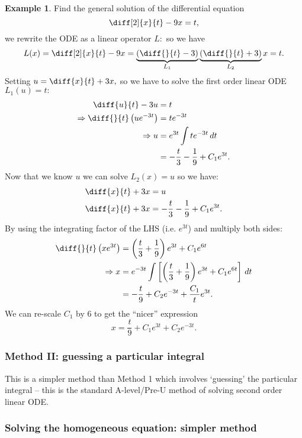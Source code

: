 \documentclass[12pt, a4paper]{article}
\newcommand{\f}[2]{\frac{#1}{#2}}
\newcommand{\imply}{\Rightarrow}
\theoremstyle{definition}
\newtheorem*{example}{Example}
\theoremstyle{plain}
\begin{document}
\begin{example}
Find the general solution of the differential equation $$\diff[2]{x}{t}-9x=t,$$ we rewrite the ODE as a linear operator $L:$ so we have $$L(x)=\diff[2]{x}{t}-9x =\underbrace{\left(\diff{}{t}-3\right)}_{L_1}\underbrace{\left(\diff{}{t}+3\right)}_{L_2}x=t.$$ Setting $u = \diff{x}{t}+3x,$ so we have to solve the first order linear ODE $L_1(u)=t:$ $$\begin{aligned}
\diff{u}{t}-3u&=t\\
\imply\diff{}{t}\left(ue^{-3t}\right) &=te^{-3t}\\
\imply u&=e^{3t}\int te^{-3t} \,dt \\
&= -\f{t}{3}-\f{1}{9}+C_1e^{3t}.
\end{aligned}$$ Now that we know $u$ we can solve $L_2(x)=u$ so we have: 
$$\begin{aligned}
\diff{x}{t}+3x &= u \\
\diff{x}{t}+3x &= -\f{t}{3}-\f{1}{9}+C_1e^{3t}.
\end{aligned}$$ By using the integrating factor of the LHS (i.e. $e^{3t}$) and multiply both sides:
$$\begin{aligned}
\diff{}{t}\left(xe^{3t}\right)&=\left(\f{t}{3}+\f{1}{9}\right)e^{3t}+C_1e^{6t}\\
\imply x&= e^{-3t}\int \left[\left(\f{t}{3}+\f{1}{9}\right)e^{3t}+C_1e^{6t}\right] \, dt \\
&= -\f{t}{9}+C_2e^{-3t}+\f{C_1}{t}e^{3t}.
\end{aligned}$$ We can re-scale $C_1$ by 6 to get the ``nicer'' expression $$x=\f{t}{9}+C_1e^{3t}+C_2e^{-3t}.$$
\end{example}

\subsubsection{Method II: guessing a particular integral}

This is a simpler method than Method 1 which involves `guessing' the particular integral -- this is the standard A-level/Pre-U method of solving second order linear ODE.

\subsubsection*{Solving the homogeneous equation: simpler method}
\end{document}
